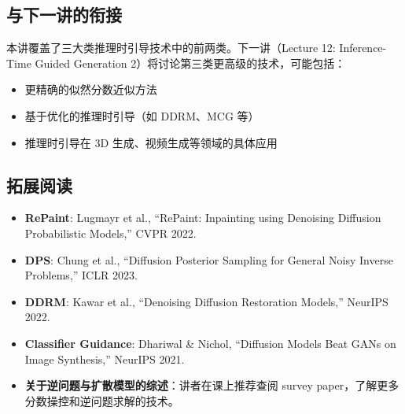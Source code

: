 \documentclass[a4paper]{article}
\begin{document}
\subsection{与下一讲的衔接}

本讲覆盖了三大类推理时引导技术中的前两类。下一讲（Lecture 12: Inference-Time Guided Generation 2）将讨论第三类更高级的技术，可能包括：
\begin{itemize}
    \item 更精确的似然分数近似方法
    \item 基于优化的推理时引导（如 DDRM、MCG 等）
    \item 推理时引导在 3D 生成、视频生成等领域的具体应用
\end{itemize}

\subsection{拓展阅读}

\begin{itemize}
    \item \textbf{RePaint}: Lugmayr et al., ``RePaint: Inpainting using Denoising Diffusion Probabilistic Models,'' CVPR 2022.
    \item \textbf{DPS}: Chung et al., ``Diffusion Posterior Sampling for General Noisy Inverse Problems,'' ICLR 2023.
    \item \textbf{DDRM}: Kawar et al., ``Denoising Diffusion Restoration Models,'' NeurIPS 2022.
    \item \textbf{Classifier Guidance}: Dhariwal \& Nichol, ``Diffusion Models Beat GANs on Image Synthesis,'' NeurIPS 2021.
    \item \textbf{关于逆问题与扩散模型的综述}：讲者在课上推荐查阅 survey paper，了解更多分数操控和逆问题求解的技术。
\end{itemize}

\end{document}
